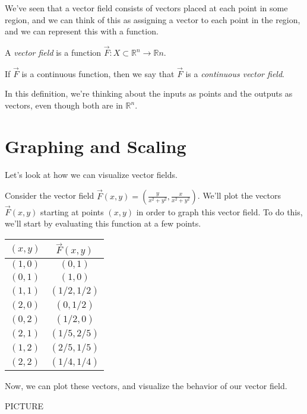 \documentclass{ximera}
\begin{document}
We've seen that a vector field consists of vectors placed at each point in some region, and we can think of this as assigning a vector to each point in the region, and we can represent this with a function.

\begin{definition}
A \emph{vector field} is a function $\vec{F}:X\subset\mathbb{R}^n\rightarrow\mathbb{R}n$.

If $\vec{F}$ is a continuous function, then we say that $\vec{F}$ is a \emph{continuous vector field}.
\end{definition}

In this definition, we're thinking about the inputs as points and the outputs as vectors, even though both are in $\mathbb{R}^n$.

\section*{Graphing and Scaling}

Let's look at how we can visualize vector fields.

\begin{example}
Consider the vector field $\vec{F}(x,y) = \left(\frac{y}{x^2+y^2}, \frac{x}{x^2+y^2}\right)$. We'll plot the vectors $\vec{F}(x,y)$ starting at points $(x,y)$ in order to graph this vector field. To do this, we'll start by evaluating this function at a few points.

\begin{center}
\begin{tabular}{|c|c|}
\hline
$(x,y)$ & $\vec{F}(x,y)$\\
\hline
$(1,0)$ & $(0,1)$\\
$(0,1)$ & $(1,0)$\\
$(1,1)$ & $(1/2, 1/2)$\\
$(2,0)$ & $(0,1/2)$\\
$(0,2)$ & $(1/2,0)$\\
$(2,1)$ & $(1/5, 2/5)$\\
$(1,2)$ & $(2/5, 1/5)$\\
$(2,2)$ & $(1/4,1/4)$\\
\hline
\end{tabular}
\end{center}

Now, we can plot these vectors, and visualize the behavior of our vector field.

PICTURE

\end{example}
\end{document}
